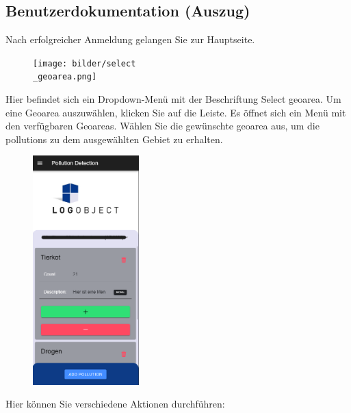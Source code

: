 \documentclass[a4paper,12pt]{article}
\begin{document}
\clearpage
\subsection{Benutzerdokumentation (Auszug)}
\label{sec:benutzerdokumentation}
Nach erfolgreicher Anmeldung gelangen Sie zur Hauptseite.

\begin{figure}[h]
\centering
\texttt{[image: bilder/select\\\_geoarea.png]}
\end{figure}

\noindent Hier befindet sich ein Dropdown-Menü mit der Beschriftung \glqq Select geoarea\grqq{}. Um eine Geoarea auszuwählen, klicken Sie auf die Leiste. Es öffnet sich ein Menü mit den verfügbaren Geoareas. Wählen Sie die gewünschte \gls{geoarea} aus, um die \glspl{pollution} zu dem ausgewählten Gebiet zu erhalten.

\begin{figure}[h]
\centering
\includegraphics[width=0.365\textwidth]{bilder/pollutions1.png}
\end{figure}

\noindent Hier können Sie verschiedene Aktionen durchführen:
\end{document}

